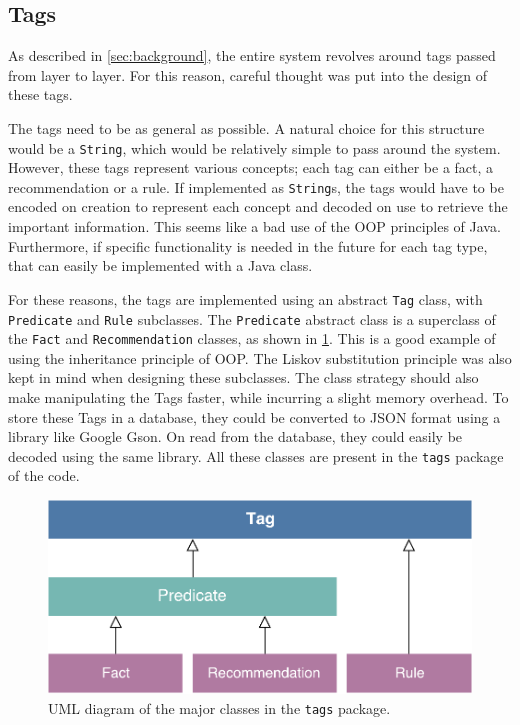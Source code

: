 \documentclass[titlepage,11pt]{article}
\newcommand{\code}[1]{\texttt{#1}}
\begin{document}
\subsection{Tags}
As described in \autoref{sec:background}, the entire system revolves around tags passed from layer to layer. For this reason, careful thought was put into the design of these tags.

The tags need to be as general as possible. A natural choice for this structure would be a \code{String}, which would be relatively simple to pass around the system. However, these tags represent various concepts; each tag can either be a fact, a recommendation or a rule. If implemented as \code{String}s, the tags would have to be encoded on creation to represent each concept and decoded on use to retrieve the important information. This seems like a bad use of the OOP principles of Java. Furthermore, if specific functionality is needed in the future for each tag type, that can easily be implemented with a Java class.

For these reasons, the tags are implemented using an abstract \code{Tag} class, with \code{Predicate} and \code{Rule} subclasses. The \code{Predicate} abstract class is a superclass of the \code{Fact} and \code{Recommendation} classes, as shown in \cref{fig:uml_tags}. This is a good example of using the inheritance principle of OOP. The Liskov substitution principle was also kept in mind when designing these subclasses. The class strategy should also make manipulating the Tags faster, while incurring a slight memory overhead. To store these Tags in a database, they could be converted to JSON format using a library like Google Gson. On read from the database, they could easily be decoded using the same library. All these classes are present in the \code{tags} package of the code.

\begin{figure}[!htb]
	\includegraphics[width=\columnwidth]{figures/uml_tags.pdf}
	\caption{UML diagram of the major classes in the \code{tags} package.}
	\label{fig:uml_tags}
\end{figure}
\end{document}
